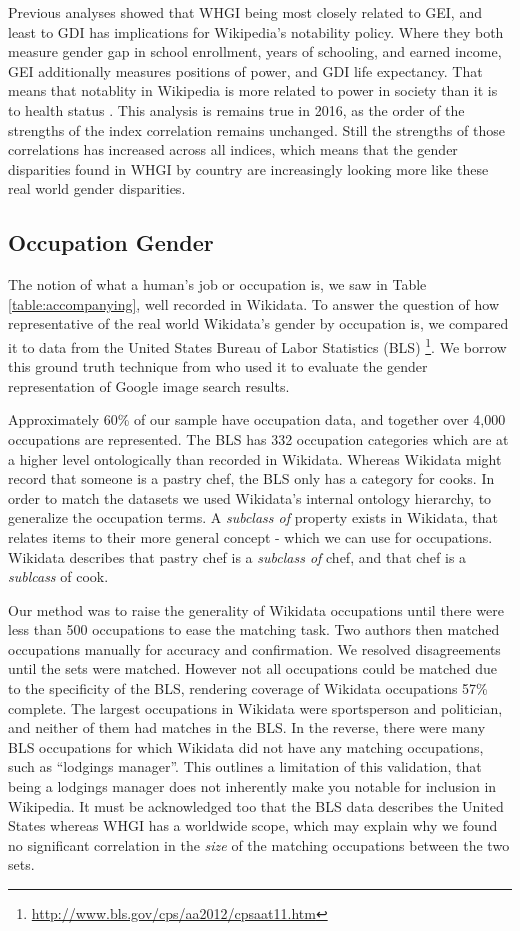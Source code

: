 \documentclass{sig-alternate-05-2015}
\begin{document}
Previous analyses showed that WHGI being most closely related to GEI, and least to GDI has implications for Wikipedia's notability policy. Where they both measure gender gap in school enrollment, years of schooling, and earned income, GEI additionally measures positions of power, and GDI life expectancy. That means that notablity in Wikipedia is more related to power in society than it is to health status \cite{klein_wikipedia_2015}. This analysis is remains true in 2016, as the order of the strengths of the index correlation remains unchanged. Still the strengths of those correlations has increased across all indices, which means that the gender disparities found in WHGI by country are increasingly looking more like these real world gender disparities.


\subsection{Occupation Gender}

The notion of what a human's job or occupation is, we saw in Table \ref{table:accompanying}, well recorded in Wikidata. To answer the question of how representative of the real world Wikidata's gender by occupation is, we compared it to data from the United States Bureau of Labor Statistics (BLS) \footnote{\url{http://www.bls.gov/cps/aa2012/cpsaat11.htm}}. We borrow this ground truth technique from \cite{kay_unequal_2015} who used it to evaluate the gender representation of Google image search results.

Approximately 60\% of our sample have occupation data, and together over 4,000 occupations are represented. The BLS has 332 occupation categories which are at a higher level ontologically than  recorded in Wikidata. Whereas Wikidata might record that someone is a pastry chef, the BLS only has a category for cooks. In order to match the datasets we used Wikidata's internal ontology hierarchy, to generalize the occupation terms. A \textit{subclass of} property exists in Wikidata, that relates items to their more general concept - which we can use for occupations. Wikidata describes that pastry chef is a \textit{subclass of} chef, and that chef is a \textit{sublcass} of cook.

Our method was to raise the generality of Wikidata occupations until there were less than 500 occupations to ease the matching task. Two authors then matched occupations manually for accuracy and confirmation. We resolved disagreements until the sets were matched. However not all occupations could be matched due to the specificity of the BLS, rendering coverage of Wikidata occupations 57\% complete. The largest occupations in Wikidata were sportsperson and politician, and neither of them had matches in the BLS. In the reverse, there were many BLS occupations for which Wikidata did not have any matching occupations, such as ``lodgings manager''. This outlines a limitation of this validation, that being a lodgings manager does not inherently make you notable for inclusion in Wikipedia. It must be acknowledged too that the BLS data describes the United States whereas WHGI has a worldwide scope, which may explain why we found no significant correlation in the \textit{size} of the matching occupations between the two sets.
\end{document}

